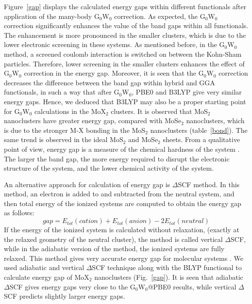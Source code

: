 \documentclass[nofootinbib,10pt,aip,twocolumn,showpacs]{revtex4-1}
\begin{document}
Figure~\ref{gap} displays the calculated energy gaps within different functionals
after application of the many-body G$_0$W$_0$ correction.
As expected, the G$_0$W$_0$ correction significantly enhances 
the value of the band gaps within all functionals.
The enhancement is more pronounced in the smaller clusters,
which is due to the lower electronic screening in these systems.
As mentioned before, in the G$_0$W$_0$ method, a screened coulomb
interaction is switched on between the Kohn-Sham particles.
Therefore, lower screening in the smaller clusters enhances
the effect of G$_0$W$_0$ correction in the energy gap.
Moreover, it is seen that the G$_0$W$_0$ correction decreases the difference
between the band gap within hybrid and GGA functionals,
in such a way that after G$_0$W$_0$, PBE0 and B3LYP give very similar energy gaps.
Hence, we deduced that B3LYP may also be a proper starting point for
G$_0$W$_0$ calculations in the MoX$_2$ clusters.
It is observed that MoS$_2$ nanoclusters have greater energy gap,
compared with MoSe$_2$ nanoclusters,
which is due to the stronger M-X bonding in 
the MoS$_2$ nanoclusters (table~\ref{bond}).
The same trend is observed in the ideal MoS$_2$ and MoSe$_2$ sheets.
From a qualitative point of view, energy gap is a measure of 
the chemical hardness of the system \cite{kohn1996density}.
The larger the band gap, the more energy required to
disrupt the electronic structure of the system, and the
lower chemical activity of the system.

An alternative approach for calculation of energy gap is $\Delta$SCF method.
In this method, an electron is added to and subtracted from the neutral system, and 
then total energy of the ionized systems are computed
to obtain the energy gap as follows:
%
\begin{equation}
gap=E_{tot}(cation)+E_{tot}(anion)-2E_{tot}(neutral)
\label{deltascf}
\end{equation}
%
If the energy of the ionized system is calculated without relaxation,
(exactly at the relaxed geometry of the neutral cluster), 
the method is called vertical $\Delta$SCF,
while in the adiabatic version of the method, the ionized systems are fully relaxed.
This method gives very accurate energy gap for molecular systems \cite{lee2015}.
We used adiabatic and vertical $\Delta$SCF technique along with the BLYP
functional to calculate energy gap of MoX$_2$ nanoclusters (Fig.~\ref{gap}).
It is seen that adiabatic $\Delta$SCF gives energy gaps
very close to the G$_0$W$_0$@PBE0 results, 
while vertical $\Delta$SCF predicts slightly larger energy gaps.
\end{document}

